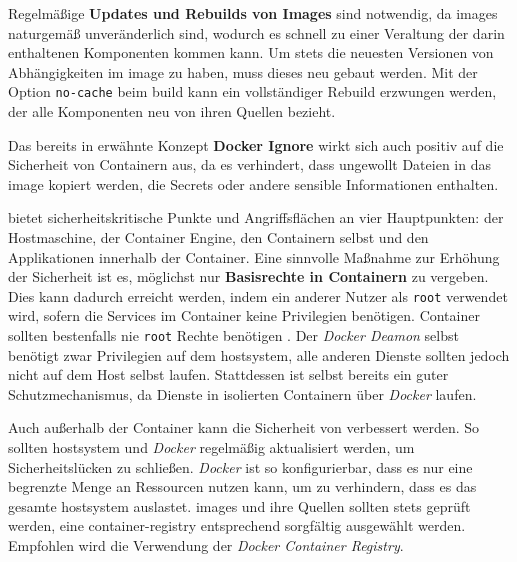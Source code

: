 Regelmäßige \textbf{Updates und Rebuilds von Images} sind notwendig, da \Glspl{image} naturgemäß unveränderlich sind, wodurch es schnell zu einer Veraltung der darin enthaltenen Komponenten kommen kann. Um stets die neuesten Versionen von Abhängigkeiten im \Gls{image} zu haben, muss dieses neu gebaut werden. Mit der Option \texttt{no-cache} beim \Gls{build} kann ein vollständiger Rebuild erzwungen werden, der alle Komponenten neu von ihren Quellen bezieht. \cite{300:Building-Best-Practices}

Das bereits in  erwähnte Konzept \textbf{Docker Ignore} wirkt sich auch positiv auf die Sicherheit von Containern aus, da es verhindert, dass ungewollt Dateien in das \Gls{image} kopiert werden, die Secrets oder andere sensible Informationen enthalten. \cite{300:Building-Best-Practices}

 bietet sicherheitskritische Punkte und Angriffsflächen an vier Hauptpunkten: der Hostmaschine, der Container Engine, den Containern selbst und den Applikationen innerhalb der Container. \cite{021:Docker-Security-Threat-Model-and-Best-Practices} Eine sinnvolle Maßnahme zur Erhöhung der Sicherheit ist es, möglichst nur \textbf{Basisrechte in Containern} zu vergeben. Dies kann dadurch erreicht werden, indem ein anderer Nutzer als \texttt{root} verwendet wird, sofern die Services im Container keine Privilegien benötigen. \cite{021:Docker-Security-Threat-Model-and-Best-Practices,024:Investiugating-Impact-of-Containerization-on-Deployment-Process-in-DevOps,300:Building-Best-Practices} Container sollten bestenfalls nie \texttt{root} Rechte benötigen \cite{022:Automated-Cloud-Infrastructure-Continous-Integration-and-Continous-Delivery-using-Docker}. Der \textit{Docker Deamon} selbst benötigt zwar Privilegien auf dem \Gls{hostsystem}, alle anderen Dienste sollten jedoch nicht auf dem Host selbst laufen. Stattdessen ist  selbst bereits ein guter Schutzmechanismus, da Dienste in isolierten Containern über \textit{Docker} laufen. \cite{022:Automated-Cloud-Infrastructure-Continous-Integration-and-Continous-Delivery-using-Docker}

Auch außerhalb der Container kann die Sicherheit von  verbessert werden. So sollten \Gls{hostsystem} und \textit{Docker} regelmäßig aktualisiert werden, um Sicherheitslücken zu schließen. \textit{Docker} ist so konfigurierbar, dass es nur eine begrenzte Menge an Ressourcen nutzen kann, um zu verhindern, dass es das gesamte \Gls{hostsystem} auslastet. \Glspl{image} und ihre Quellen sollten stets geprüft werden, eine \Gls{container-registry} entsprechend sorgfältig ausgewählt werden. Empfohlen wird die Verwendung der \textit{Docker Container Registry}. \cite{021:Docker-Security-Threat-Model-and-Best-Practices}

